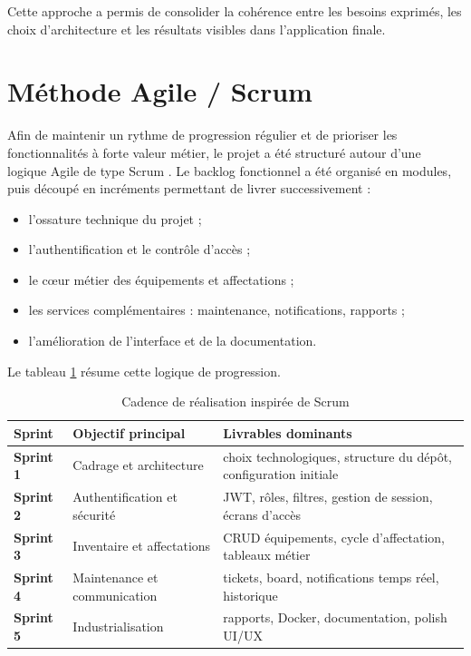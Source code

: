 Cette approche a permis de consolider la cohérence entre les besoins exprimés, les choix d'architecture et les résultats visibles dans l'application finale.

\section{Méthode Agile / Scrum}
Afin de maintenir un rythme de progression régulier et de prioriser les fonctionnalités à forte valeur métier, le projet a été structuré autour d'une logique Agile de type Scrum \cite{schwaber2020}. Le backlog fonctionnel a été organisé en modules, puis découpé en incréments permettant de livrer successivement :
\begin{itemize}
  \item l'ossature technique du projet ;
  \item l'authentification et le contrôle d'accès ;
  \item le cœur métier des équipements et affectations ;
  \item les services complémentaires : maintenance, notifications, rapports ;
  \item l'amélioration de l'interface et de la documentation.
\end{itemize}

Le tableau \ref{tab:scrum-cadence} résume cette logique de progression.

\begin{table}[H]
\centering
\caption{Cadence de réalisation inspirée de Scrum}
\label{tab:scrum-cadence}
\begin{tabularx}{\textwidth}{>{\bfseries}p{2cm}p{3.8cm}X}
\toprule
Sprint & Objectif principal & Livrables dominants \\
\midrule
Sprint 1 & Cadrage et architecture & choix technologiques, structure du dépôt, configuration initiale \\
Sprint 2 & Authentification et sécurité & JWT, rôles, filtres, gestion de session, écrans d'accès \\
Sprint 3 & Inventaire et affectations & CRUD équipements, cycle d'affectation, tableaux métier \\
Sprint 4 & Maintenance et communication & tickets, board, notifications temps réel, historique \\
Sprint 5 & Industrialisation & rapports, Docker, documentation, polish UI/UX \\
\bottomrule
\end{tabularx}
\end{table}

